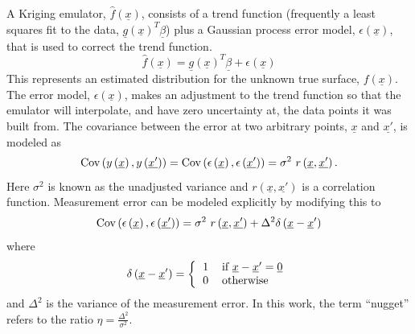 \documentclass{article}
\begin{document}
A Kriging emulator, $\hat{f}\left(\underline{x}\right)$, consists of a
trend function (frequently a least squares fit to the data,
$\underline{g}\left(\underline{x}\right)^T\underline{\beta}$) plus a
Gaussian process error model, $\epsilon\left(\underline{x}\right)$,
that is used to correct the trend function.
\begin{displaymath}
\hat{f}\left(\underline{x}\right)=\underline{g}\left(\underline{x}\right)^T\underline{\beta}+\epsilon\left(\underline{x}\right)
\end{displaymath}
This represents an estimated distribution for the unknown true
surface, $f\left(\underline{x}\right)$.  The error model,
$\epsilon\left(\underline{x}\right)$, makes an adjustment to the trend
function so that the emulator will interpolate, and have zero
uncertainty at, the data points it was built from.  The covariance
between the error at two arbitrary points, $\underline{x}$ and
$\underline{x'}$, is modeled as
\begin{displaymath}
{\rm Cov}\left(y\left(\underline{x}\right),y\left(\underline{x'}\right)\right)={\rm Cov}\left(\epsilon\left(\underline{x}\right),\epsilon\left(\underline{x'}\right)\right)=\sigma^2\ r\left(\underline{x},\underline{x'}\right).
\end{displaymath}
Here $\sigma^2$ is known as the unadjusted variance and 
$r\left(\underline{x},\underline{x'}\right)$ is a correlation function. 
Measurement error can be modeled explicitly by modifying this to
\begin{displaymath}
{\rm Cov}\left(\epsilon\left(\underline{x}\right),\epsilon\left(\underline{x'}\right)\right)=\sigma^2\ r\left(\underline{x},\underline{x'}\right)+\Delta^2\delta\left(\underline{x}-\underline{x}'\right)
\end{displaymath}
where 
\begin{displaymath}
\delta\left(\underline{x}-\underline{x}'\right)=\left\{\begin{tabular}{ll} 1 & if $\underline{x}-\underline{x}'=\underline{0}$ \\ 0 & otherwise \end{tabular} \right.
\end{displaymath}
and $\Delta^2$ is the variance of the measurement error.  In this work, 
the term ``nugget'' refers to the ratio 
$\eta=\frac{\Delta^2}{\sigma^2}$.\newline
\end{document}
